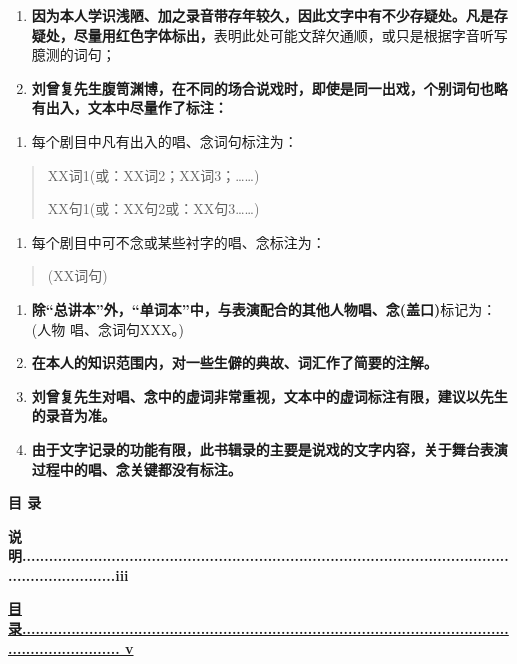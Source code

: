 \begin{enumerate}
\def\labelenumi{\arabic{enumi}.}
\item
  \textbf{因为本人学识浅陋、加之录音带存年较久，因此文字中有不少存疑处。凡是存疑处，尽量用红色字体标出，}表明此处可能文辞欠通顺，或只是根据字音听写臆测的词句；
\item
  \textbf{刘曾复先生腹笥渊博，在不同的场合说戏时，即使是同一出戏，个别词句也略有出入，文本中尽量作了标注：}
\end{enumerate}

\begin{enumerate}
\def\labelenumi{\arabic{enumi}.}
\item
  每个剧目中凡有出入的唱、念词句标注为：
\end{enumerate}

\begin{quote}
{XX词1}(或：XX词2；XX词3；\ldots{}\ldots{})

{XX句1}(或：XX句2或：XX句3\ldots{}\ldots{})
\end{quote}

\begin{enumerate}
\def\labelenumi{\arabic{enumi}.}
\setcounter{enumi}{1}
\item
  每个剧目中可不念或某些衬字的唱、念标注为：
\end{enumerate}

\begin{quote}
(XX词句)
\end{quote}

\begin{enumerate}
\def\labelenumi{\arabic{enumi}.}
\setcounter{enumi}{2}
\item
  \textbf{除``总讲本''外，``单词本''中，与表演配合的其他人物唱、念(盖口)}标记为：
  (人物 唱、念词句XXX。)
\item
  \textbf{在本人的知识范围内，对一些生僻的典故、词汇作了简要的注解。}
\item
  \textbf{刘曾复先生对唱、念中的虚词非常重视，文本中的虚词标注有限，建议以先生的录音为准。}
\item
  \textbf{由于文字记录的功能有限，此书辑录的主要是说戏的文字内容，关于舞台表演过程中的唱、念关键都没有标注。}
\end{enumerate}

\textbf{目 录}

\textbf{说
明.....................................................................................................................................iii}

\href{/l}{\textbf{目
录......................................................................................................................................
v}}

